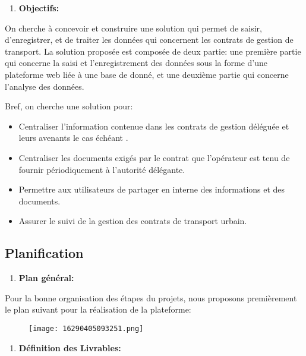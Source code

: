\documentclass[
]{article}
\begin{document}
\begin{enumerate}
\def\labelenumi{\arabic{enumi}.}
\item
  \textbf{Objectifs:}
\end{enumerate}

On cherche à concevoir et construire une solution qui permet de saisir,
d'enregistrer, et de traiter les données qui concernent les contrats de
gestion de transport. La solution proposée est composée de deux partie:
une première partie qui concerne la saisi et l'enregistrement des
données sous la forme d'une plateforme web liée à une base de donné, et
une deuxième partie qui concerne l'analyse des données.

Bref, on cherche une solution pour:

\begin{itemize}
\item
  Centraliser l'information contenue dans les contrats de gestion
  déléguée et leurs avenants le cas échéant .
\item
  Centraliser les documents exigés par le contrat que l'opérateur est
  tenu de fournir périodiquement à l'autorité délégante.
\item
  Permettre aux utilisateurs de partager en interne des informations et
  des documents.
\item
  Assurer le suivi de la gestion des contrats de transport urbain.
\end{itemize}

\hypertarget{planification}{%
\subsection{Planification}\label{planification}}

\begin{enumerate}
\def\labelenumi{\arabic{enumi}.}
\item
  \textbf{Plan général:}
\end{enumerate}

Pour la bonne organisation des étapes du projets, nous proposons
premièrement le plan suivant pour la réalisation de la plateforme:

\begin{figure}
\centering
\texttt{[image: 16290405093251.png]}
\caption{}
\end{figure}

\begin{enumerate}
\def\labelenumi{\arabic{enumi}.}
\item
  \textbf{Définition des Livrables:}
\end{enumerate}
\end{document}
